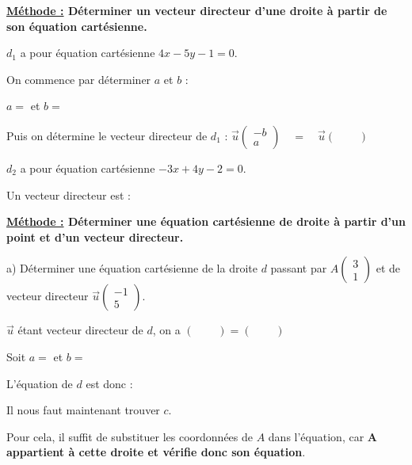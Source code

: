 \documentclass[12pt]{article}
\newcommand*{\Coord}[2]{%
  \ensuremath{
    \begin{pmatrix} 
      #1\\ 
      #2 
    \end{pmatrix}}}
\begin{document}
\vspace{10pt}
{\color{RedOrange}\textbf{\underline{Méthode :} Déterminer un vecteur directeur d'une droite à partir
de son équation cartésienne.}}

\vspace{5pt}
\hspace{1cm}\textbullet$d_1$ a pour équation cartésienne $4x - 5y - 1 = 0$.

\vspace{5pt}
On commence par déterminer $a$ et $b$ :

\vspace{10pt}
\hspace{1cm}$a = $ \hspace{2cm} et $b = $

\vspace{10pt}
Puis on détermine le vecteur directeur de $d_1$ : $\overrightarrow{u}\Coord{-b}{a} 
\quad = \quad \overrightarrow{u}\Coord{\ \ \ \ \ \ }{\ \ \ \ \ \ }$

\vspace{10pt}
\hspace{1cm}\textbullet$d_2$ a pour équation cartésienne $-3x + 4y - 2 = 0$.

\vspace{5pt}
Un vecteur directeur est : 

\vspace{2cm}

{\color{RedOrange}\textbf{\underline{Méthode :} Déterminer une équation cartésienne de 
droite à partir d'un point et d'un vecteur directeur.}}

\vspace{5pt}
\hspace{1cm}a) Déterminer une équation cartésienne de la droite $d$ passant par 
$A\Coord{3}{1}$ et de vecteur directeur $\overrightarrow{u}\Coord{-1}{5}$.

\vspace{5pt}
$\overrightarrow{u}$ étant vecteur directeur de $d$, on a 
$\Coord{\ \ \ \ \ \ }{\ \ \ \ \ \ } = \Coord{\ \ \ \ \ \ }{\ \ \ \ \ \ }$

Soit $a = $ \hspace{1cm} et $b = $

\vspace{5pt}
L'équation de $d$ est donc : 

\vspace{5pt}
Il nous faut maintenant trouver $c$.

\vspace{5pt}
Pour cela, il suffit de substituer les coordonnées de $A$ dans l'équation, car 
\textbf{$\bm{A}$ appartient à cette droite et vérifie donc son équation}.
\end{document}
